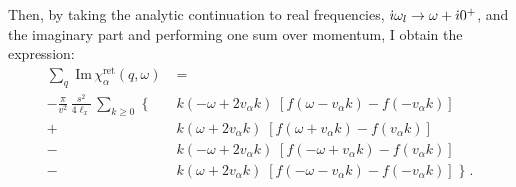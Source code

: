 Then, by taking the analytic continuation to real frequencies, $\dot{\imath} \omega_{l} \to  \omega + \dot{\imath} 0^{+}$, and the imaginary part and performing one sum over momentum, I obtain the expression:
\begin{equation}
    \begin{split}
     \sum_{q} \;\mathrm{Im} \,  \chi_{\alpha}^{\text{ret}}(q, \omega) \;  &= \; \\[5pt]   - \frac{ \pi}{v^{2}} \, \frac{s^2}{4 \ell_x} \,  \sum_{ k \geq 0}  \;   \Big\{  \;       & k( - \omega  + 2 v_{\alpha} k)  \;   \left[ f( \omega - v_{ \alpha } k ) - f( - v_{ \alpha } k )  \right] \;
        \\[5pt]    +  \; &k (  \omega +2v_{ \alpha } k )  \;   \left[ f(   \omega + v_{ \alpha } k ) - f(  v_{ \alpha } k )   \right] \;        \\[5pt]
         -  \;  & k(-  \omega + 2 v_{ \alpha } k ) \;   \left[  f(  - \omega + v_{ \alpha } k ) - f(  v_{ \alpha } k )  \right] \;  \\[5pt]  - \;   & k( \omega+ 2 v_{ \alpha } k) \; \left[ f(  -\omega - v_{ \alpha } k ) - f( -  v_{ \alpha } k )   \right] \;  \Big\}  \; .
    \end{split} 
\end{equation}

